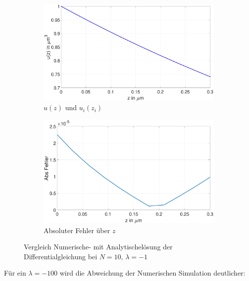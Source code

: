   \begin{figure}[h]
 	\begin{subfigure}[b]{0.5\textwidth}
 		\includegraphics[width=\textwidth]{figures/station_gl_2_1/test_n10}
 		\caption{$u(z)$ und $u_{i}(z_i)$}
 	\end{subfigure}
 	\hfill
 	\begin{subfigure}[b]{0.5\textwidth}
 		\includegraphics[width=1\linewidth]{figures/station_gl_2_1/test_n10_fehler}
 		\caption{Absoluter Fehler über $z$}
 	\end{subfigure}
 	\caption{Vergleich  Numerische- mit Analytischelösung der Differentialgleichung bei $N=10,\,\lambda=-1$}
 	
 \end{figure}
 Für ein $\lambda=-100$ wird die Abweichung der Numerischen Simulation deutlicher:
  
